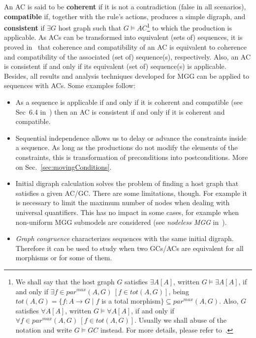 \documentclass{fundam}
\begin{document}
An AC is said to be \textbf{coherent} if it is not a contradiction
(false in all scenarios), \textbf{compatible} if, together with the
rule's actions, produces a simple digraph, and \textbf{consistent} if
$\exists G$ host graph such that $G \models AC$\footnote{We shall say
  that the host graph $G$ satisfies $\exists A[A]$, written $G \models
  \exists A[A]$, if and only if $\exists f \in par^{max}(A, G) \: [ f
  \in tot(A, G)]$, being $tot(A, G) = \{ f:A \to G \; | \; f$ is a
  total morphism$\} \subseteq par^{max}(A, G)$. Also, $G$ satisfies
  $\forall A[A]$, written\phantom{i} $G \models \forall A[A]$, if and
  only if $\forall f \in par^{max}(A, G) \: [f \in tot(A,
  G)]$. Usually we shall abuse of the notation and write $G \models
  GC$ instead. For more details, please refer
  to~\cite{MGGfundamenta}.} to which the production is applicable. As
ACs can be transformed into equivalent (sets of) sequences, it is
proved in~\cite{MGGfundamenta} that coherence and compatibility of an
AC is equivalent to coherence and compatibility of the associated (set
of) sequence(s), respectively. Also, an AC is consistent if and only
if its equivalent (set of) sequence(s) is applicable. Besides, all
results and analysis techniques developed for MGG can be applied to
sequences with ACs. Some examples follow:
\begin{itemize}
\item As a sequence is applicable if and only if it is coherent and
  compatible (see Sec~6.4 in~\cite{MGGBook}) then an AC is consistent
  if and only if it is coherent and compatible.
\item Sequential independence allows us to delay or advance the
  constraints inside a sequence. As long as the productions do not
  modify the elements of the constraints, this is transformation of
  preconditions into postconditions. More on
  Sec.~\ref{sec:movingConditions}.
\item Initial digraph calculation solves the problem of finding a host
  graph that satisfies a given AC/GC. There are some limitations,
  though. For example it is necessary to limit the maximum number of
  nodes when dealing with universal quantifiers. This has no impact in
  some cases, for example when non-uniform MGG submodels are
  considered (see \emph{nodeless MGG} in~\cite{MGGmodel}).
\item \emph{Graph congruence} characterizes sequences with the same
  initial digraph. Therefore it can be used to study when two
  GCs/ACs are equivalent for all morphisms or for some of them.
\end{itemize}
\end{document}
